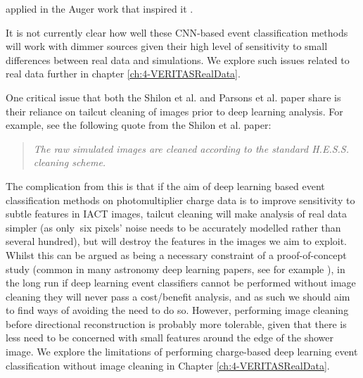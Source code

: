 applied in the Auger work that inspired it \cite{ErdmannAuger}.

It is not currently clear how well these CNN-based event classification methods will work with dimmer sources given their high level of sensitivity to small differences between real data and simulations. We explore such issues related to real data further in chapter \ref{ch:4-VERITASRealData}.

One critical issue that both the Shilon et al. and Parsons et al. paper share is their reliance on tailcut cleaning of images prior to deep learning analysis. For example, see the following quote from the Shilon et al. paper:
\begin{quote}
    \textit{The raw simulated images are cleaned according to the standard H.E.S.S. cleaning scheme.}
\end{quote}

The complication from this is that if the aim of deep learning based event classification methods on photomultiplier charge data is to improve sensitivity to subtle features in IACT images, tailcut cleaning will make analysis of real data simpler (as only $~$six pixels' noise needs to be accurately modelled rather than several hundred), but will destroy the features in the images we aim to exploit. Whilst this can be argued as being a necessary constraint of a proof-of-concept study (common in many astronomy deep learning papers, see for example \cite{dodgygal}), in the long run if deep learning event classifiers cannot be performed without image cleaning they will never pass a cost/benefit analysis, and as such we should aim to find ways of avoiding the need to do so. However, performing image cleaning before directional reconstruction is probably more tolerable, given that there is less need to be concerned with small features around the edge of the shower image. We explore the limitations of performing charge-based deep learning event classification without image cleaning in Chapter \ref{ch:4-VERITASRealData}.  

